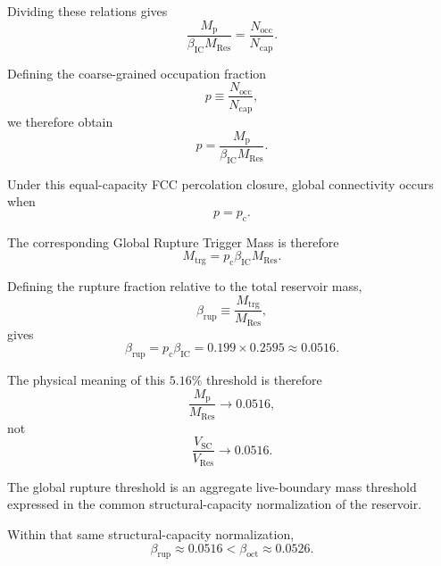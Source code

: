 Dividing these relations gives
\begin{equation}
    \frac{M_{\mathrm{p}}}
    {\beta_{\mathrm{IC}}M_{\mathrm{Res}}}
    =
    \frac{N_{\mathrm{occ}}}
    {N_{\mathrm{cap}}}.
\end{equation}

Defining the coarse-grained occupation fraction
\begin{equation}
    p
    \equiv
    \frac{N_{\mathrm{occ}}}
    {N_{\mathrm{cap}}},
\end{equation}
we therefore obtain
\begin{equation}
    p
    =
    \frac{M_{\mathrm{p}}}
    {\beta_{\mathrm{IC}}M_{\mathrm{Res}}}.
\end{equation}

Under this equal-capacity FCC percolation closure, global connectivity occurs when
\begin{equation}
    p=p_{\mathrm{c}}.
\end{equation}

The corresponding Global Rupture Trigger Mass is therefore
\begin{equation}
    M_{\mathrm{trg}}
    =
    p_{\mathrm{c}}
    \beta_{\mathrm{IC}}
    M_{\mathrm{Res}}.
\end{equation}

Defining the rupture fraction relative to the total reservoir mass,
\begin{equation}
    \beta_{\mathrm{rup}}
    \equiv
    \frac{M_{\mathrm{trg}}}
    {M_{\mathrm{Res}}},
\end{equation}
gives
\begin{equation}
    \beta_{\mathrm{rup}}
    =
    p_{\mathrm{c}}\beta_{\mathrm{IC}}
    =
    0.199\times0.2595
    \approx
    0.0516.
\end{equation}

The physical meaning of this $5.16\%$ threshold is therefore
\begin{equation}
    \frac{M_{\mathrm{p}}}{M_{\mathrm{Res}}}
    \rightarrow
    0.0516,
\end{equation}
not
\begin{equation}
    \frac{V_{\mathrm{SC}}}{V_{\mathrm{Res}}}
    \rightarrow
    0.0516.
\end{equation}

The global rupture threshold is an aggregate live-boundary mass threshold expressed in the common structural-capacity normalization of the reservoir.

Within that same structural-capacity normalization,
\begin{equation}
    \beta_{\mathrm{rup}}
    \approx
    0.0516
    <
    \beta_{\mathrm{oct}}
    \approx
    0.0526.
\end{equation}

